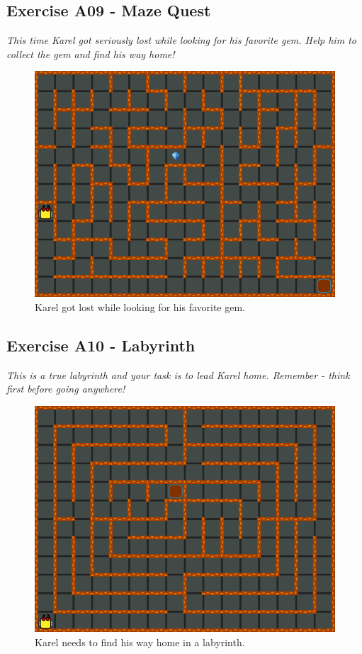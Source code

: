 \documentclass[article,A4,12pt]{llncs}
\begin{document}
\subsection{Exercise A09 - Maze Quest}

{\em This time Karel got seriously lost while looking for his favorite gem. 
Help him to collect the gem and find his way home!}\\[-7mm]

\begin{figure}[!ht]
\begin{center}
\includegraphics[height=0.4\textwidth]{img/a09.png}
\end{center}
\vspace{-4mm}
\caption{Karel got lost while looking for his favorite gem.}
\label{fig:a09}
\vspace{-4mm}
\end{figure}
\noindent
\newpage

\subsection{Exercise A10 - Labyrinth}

{\em This is a true labyrinth and your task is to lead Karel 
home. Remember - think first before going anywhere!}

\begin{figure}[!ht]
\begin{center}
\includegraphics[height=0.4\textwidth]{img/a10.png}
\end{center}
\vspace{-4mm}
\caption{Karel needs to find his way home in a labyrinth.}
\label{fig:a10}
\vspace{-4mm}
\end{figure}
\noindent
\end{document}
